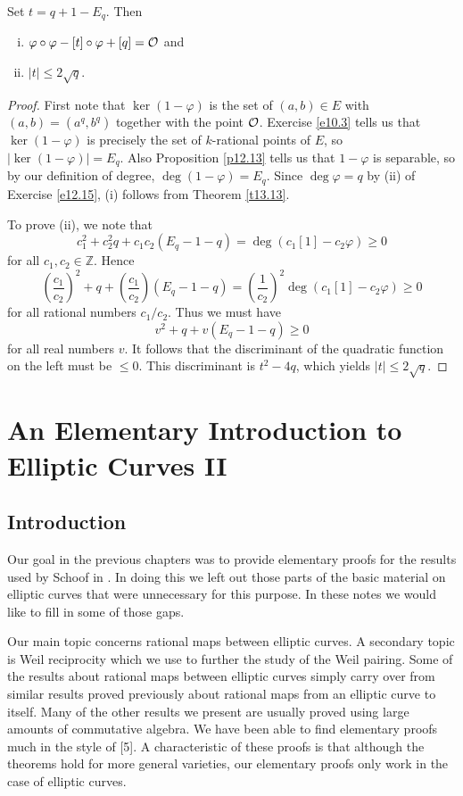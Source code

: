 \begin{theo}[Hasse]
\label{t13.14}
Set $t =q+1-E_{q}$. Then
\begin{enumerate}[(i)]
\item
$\varphi\circ\varphi-[t] \circ\varphi+[q]=\mathcal{O}$ and
\item
$|t| \leq 2\sqrt{q}$.
\end{enumerate}
\end{theo}

\begin{proof}
First note that $\ker (1-\varphi)$ is the set of $(a,b)\in E$ with $(a,b)=(a^{q},b^{q})$ together with the point $\mathcal{O}$. Exercise \ref{e10.3} tells us that $\ker (1-\varphi)$ is precisely the set of $k$-rational points of $E$, so $|\ker (1-\varphi)|=E_{q}$. Also Proposition \ref{p12.13} tells us that $ 1-\varphi$ is separable, so by our definition of degree, $\deg(1-\varphi)=E_{q}$. Since $\deg\varphi=q$ by (ii) of Exercise \ref{e12.15}, (i) follows from Theorem \ref{t13.13}.

To prove (ii), we note that
$$
c_{1}^{2}+c_{2}^{2}q+c_{1}c_{2}(E_{q}-1-q)=\deg(c_{1}[1]-c_{2}\varphi)\geq 0
$$
for all $c_{1},c_{2}\in \mathbb{Z}$. Hence
$$
\left(\frac{c_{1}}{c_{2}}\right)^{2}+q+\left(\frac{c_{1}}{c_{2}}\right)(E_{q}-1-q)=\left(\frac{1}{c_{2}}\right)^{2}\deg\left(c_{1}[1]-c_{2}\varphi\right)\geq 0
$$
for all rational numbers $c_{1}/c_{2}$. Thus we must have
$$
v^{2}+q+v(E_{q}-1-q)\geq 0
$$
for all real numbers $v$. It follows that the discriminant of the quadratic function on the left must be $\leq 0$. This discriminant is $t^{2}-4q$, which yields $|t| \leq 2\sqrt{q}$.
\end{proof}

\chapter{An Elementary Introduction to Elliptic Curves II}

\section*{Introduction}

Our goal in the previous chapters was to provide elementary proofs for the results used by Schoof in \cite{r1.5}. In doing this we left out those parts of the basic material on elliptic curves that were unnecessary for this purpose. In these notes we would like to fill in some of those gaps.

Our main topic concerns rational maps between elliptic curves. A secondary topic is Weil reciprocity which we use to further the study of the Weil pairing. Some of the results about rational maps between elliptic curves simply carry over from similar results proved previously about rational maps from an elliptic curve to itself. Many of the other results we present are usually proved using large amounts of commutative algebra. We have been able to find elementary proofs much in the style of [5]. A characteristic of these proofs is that although the theorems hold for more general varieties, our elementary proofs only work in the case of elliptic curves.

